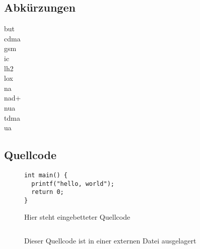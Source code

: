 \subsection{Abkürzungen}\label{subsec:abkuerzungen}
\gls{but}\\
\gls{cdma}\\
\gls{gsm}\\
\gls{ic}\\
\gls{lh2}\\
\gls{lox}\\
\gls{na}\\
\gls{nad+}\\
\gls{nua}\\
\gls{tdma}\\
\gls{ua}

\subsection{Quellcode}\label{subsec:quellcode}
\begin{figure}[H]
    \begin{center}
        \begin{verbatim}
int main() {
  printf("hello, world");
  return 0;
}
        \end{verbatim}
        \caption{Hier steht eingebetteter Quellcode}\label{fig:hier-steht-eingebetteter-quellcode}
    \end{center}
\end{figure}

\begin{figure}[H]
    \begin{center}
        \inputminted{python}{anhang/example.py}
        \caption{Dieser Quellcode ist in einer externen Datei ausgelagert}\label{fig:dieser-quellcode-ist-in-einer-externen-datei-ausgelagert}
    \end{center}
\end{figure}
